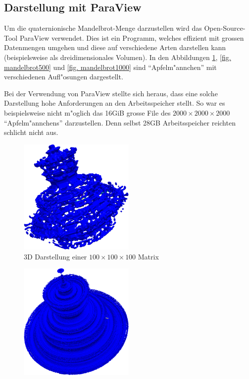 \begin{refsection}
\subsection{Darstellung mit ParaView}
Um die quaternionische Mandelbrot-Menge darzustellen wird das
Open-Source-Tool ParaView verwendet. Dies ist ein Programm, welches
effizient mit grossen Datenmengen umgehen und diese auf verschiedene
Arten darstellen kann (beispielsweise als dreidimensionales Volumen). In
den Abbildungen \ref{fig. mandelbrot100}, \ref{fig. mandelbrot500}
und \ref{fig. mandelbrot1000} sind ``Apfelm"annchen'' mit verschiedenen
Aufl"osungen dargestellt.

Bei der Verwendung von ParaView stellte sich heraus, dass eine solche
Darstellung hohe Anforderungen an den Arbeitsspeicher stellt. So
war es beispielsweise nicht m"oglich das 16GiB grosse File des
$2000\times2000\times 2000$ ``Apfelm"annchens'' darzustellen. Denn selbst
28GB Arbeitsspeicher reichten schlicht nicht aus.
\begin{figure}[ht!]\centering
	\includegraphics[width=0.5\textwidth]{apfel/pic/v1_100.png}
	\caption{3D Darstellung einer $100\times100\times 100$ Matrix}
	\label{fig. mandelbrot100}
\end{figure}
\begin{figure}[ht!]\centering
	\includegraphics[width=0.5\textwidth]{apfel/pic/v2_500.png}

\end{figure}
\end{refsection}
